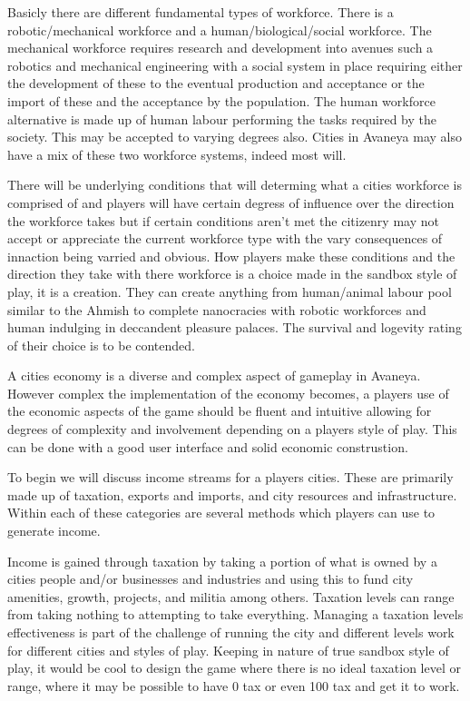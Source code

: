 Basicly there are different fundamental types of workforce. There is a robotic/mechanical workforce and a human/biological/social workforce. The mechanical workforce requires research and development into avenues such a robotics and mechanical engineering with a social system in place requiring either the development of these to the eventual production and acceptance or the import of these and the acceptance by the population. The human workforce alternative is made up of human labour performing the tasks required by the society. This may be accepted to varying degrees also. Cities in Avaneya may also have a mix of these two workforce systems, indeed most will. 

There will be underlying conditions that will determing what a cities workforce is comprised of and players will have certain degress of influence over the direction the workforce takes but if certain conditions aren't met the citizenry may not accept or appreciate the current workforce type with the vary consequences of innaction being varried and obvious. How players make these conditions and the direction they take with there workforce is a choice made in the sandbox style of play, it is a creation. They can create anything from human/animal labour pool similar to the Ahmish to complete nanocracies with robotic workforces and human indulging in deccandent pleasure palaces. The survival and logevity rating of their choice is to be contended.



A cities economy is a diverse and complex aspect of gameplay in Avaneya. However complex the implementation of the economy becomes, a players use of the economic aspects of the game should be fluent and intuitive allowing for degrees of complexity and involvement depending on a players style of play. This can be done with a good user interface and solid economic construstion. 

To begin we will discuss income streams for a players cities. These are primarily made up of taxation, exports and imports, and city resources and infrastructure. Within each of these categories are several methods which players can use to generate income.

Income is gained through taxation by taking a portion of what is owned by a cities people and/or businesses and industries and using this to fund city amenities, growth, projects, and militia among others. 
Taxation levels can range from taking nothing to attempting to take everything. Managing a taxation levels effectiveness is part of the challenge of running the city and different levels work for different cities and styles of play. Keeping in nature of true sandbox style of play, it would be cool to design the game where there is no ideal taxation level or range, where it may be possible to have 0 tax or even 100 tax and get it to work.

